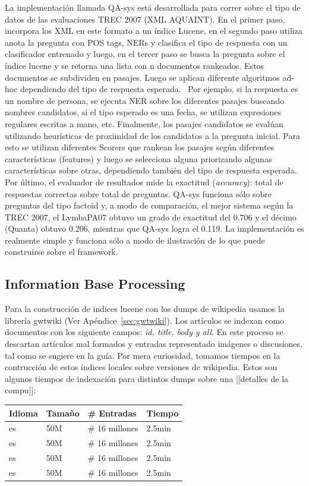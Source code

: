 La implementación llamada QA-sys está desarrollada para correr sobre
el tipo de datos de las evaluaciones TREC 2007 (XML AQUAINT). En el
primer paso, incorpora los XML en este formato a un índice Lucene, en
el segundo paso utiliza anota la pregunta con POS tags, NERs y
clasifica el tipo de respuesta con un clasificador entrenado y luego,
en el tercer paso se busca la pregunta sobre el índice lucene y se
retorna una lista con n documentos rankeados. Estos documentos se
subdividen en pasajes. Luego se aplican diferente algoritmos ad-hoc
dependiendo del tipo de respuesta esperada. \ Por ejemplo, si la
respuesta es un nombre de persona, se ejecuta NER sobre los diferentes
pasajes buscando nombres candidatos, si el tipo esperado es una fecha,
se utilizan expresiones regulares escritas a mano, etc. Finalmente, los
pasajes candidatos se evalúan utilizando heurísticas de proximidad
de los candidatos a la pregunta inicial. Para esto se utilizan
diferentes Scorers que rankean los pasajes según diferentes
características (features) y luego se selecciona alguna priorizando
algunas características sobre otras, dependiendo también del tipo
de respuesta esperada. Por último, el evaluador de resultados mide la
exactitud (\textit{accuracy}): total de respuestas correctas sobre
total de preguntas. QA-sys funciona sólo sobre preguntas del tipo
factoid y, a modo de comparación, el mejor sistema según la TREC
2007, el LymbaPA07 obtuvo un grado de exactitud del 0.706 y el décimo
(Quanta) obtuvo 0.206, mientras que QA-sys logra el 0.119. La
implementación es realmente simple y funciona sólo a modo de
ilustración de lo que puede construirse sobre el framework. 


\subsection{Information Base Processing}
Para la construcción de indices lucene con los dumps de wikipedia usamos la librería gwtwiki (Ver Apéndice~\ref{sec:gwtwiki}).
Los artículos se indexan como documentos con los siguiente campos: \emph{id, title, body y all}. En este proceso se descartan artículos mal formados y 
entradas representado imágenes o discusiones, tal como se sugiere en la guía. 
Por mera curiosidad, tomamos tiempos en la contrucción de estos índices locales sobre versiones de wikipedia.
Estos son algunos tiempos de indexación para distintos dumps sobre una [[detalles de la compu]]:
\begin{center}
\begin{tabular}{| l | l | l | l |}
\hline
Idioma & Tamaño & \# Entradas & Tiempo \\ \hline
es & 50M & \# 16 millones & 2.5min \\ \hline
es & 50M & \# 16 millones & 2.5min \\ \hline
es & 50M & \# 16 millones & 2.5min \\ \hline
es & 50M & \# 16 millones & 2.5min \\ \hline
\end{tabular}
\end{center}


